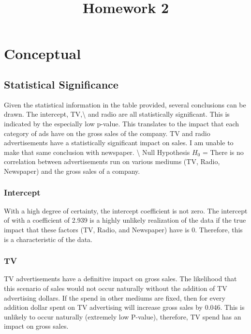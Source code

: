 \documentclass[11pt]{article}
\title{Homework 2}
\begin{document}
    
    
    
    
    

    
    \section{Conceptual}\label{conceptual}

    \subsection{Statistical Significance}\label{statistical-significance}

Given the statistical information in the table provided, several
conclusions can be drawn. The intercept, TV,\textbackslash{} and radio
are all statistically significant. This is indicated by the especially
low p-value. This translates to the impact that each category of ads
have on the gross sales of the company. TV and radio advertisements have
a statistically significant impact on sales. I am unable to make that
same conclusion with newspaper. \textbackslash{} Null Hypothesis \(H_0\)
= There is no correlation between advertisements run on various mediums
(TV, Radio, Newspaper) and the gross sales of a company.

\subsubsection{Intercept}\label{intercept}

With a high degree of certainty, the intercept coefficient is not zero.
The intercept of with a coefficient of 2.939 is a highly unlikely
realization of the data if the true impact that these factors (TV,
Radio, and Newspaper) have is 0. Therefore, this is a characteristic of
the data.

\subsubsection{TV}\label{tv}

TV advertisements have a definitive impact on gross sales. The
likelihood that this scenario of sales would not occur naturally without
the addition of TV advertising dollars. If the spend in other mediums
are fixed, then for every addition dollar spent on TV advertising will
increase gross sales by 0.046. This is unlikely to occur naturally
(extremely low P-value), therefore, TV spend has an impact on gross
sales.
\end{document}
